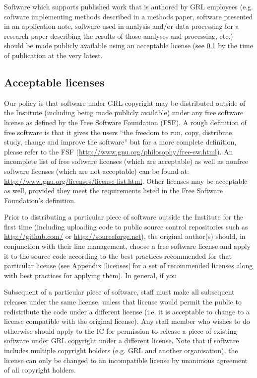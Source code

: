 \documentclass[10pt,a4paper]{article}
\begin{document}
\par Software which supports published work that is authored by GRL employees (e.g. 
software implementing methods described in a methods paper, software presented 
in an application note, software used in analysis and/or data processing for a 
research paper describing the results of those analyses and processing, etc.) should 
be made publicly available using an acceptable license (see \ref{policy.licenses} 
by the time of publication at the very latest. 




\subsection{Acceptable licenses}
\label{policy.licenses}
\par Our policy is that software under GRL copyright may be distributed outside of 
the Institute (including being made publicly available) under any free software 
license as defined by the Free Software Foundation (FSF). A rough definition of 
free software is that it gives the users 
``the freedom to run, copy, distribute, study, change and improve the software'' 
but for a more complete definition, please refer to the FSF 
(\url{http://www.gnu.org/philosophy/free-sw.html}). 
An incomplete list of free software licenses (which are acceptable) as well as 
nonfree software licenses (which are not acceptable) can be found at: 
\url{http://www.gnu.org/licenses/license-list.html}. Other licenses may be 
acceptable as well, provided they meet the requirements listed in the Free 
Software Foundation's definition. 

\par Prior to distributing a particular piece of software outside the Institute for the 
first time (including uploading code to public source control repositories such 
as \url{http://github.com/} or \url{http://sourceforge.net}), the original author(s) 
should, in conjunction with their line management, choose a free software 
license and apply it to the source code according to the best practices 
recommended for that particular license (see Appendix \ref{licenses} for a set 
of recommended licenses along with best practices for applying them). In 
general, if you 

\par Subsequent of a particular piece of software, staff must make all subsequent 
releases under the same license, unless that license would permit the public to 
redistribute the code under a different license (i.e. it is acceptable to change to a license 
compatible with the original license). Any staff member who wishes to do otherwise 
should apply to the IC for permission to release a piece of existing software under 
GRL copyright under a different license. Note that if software includes multiple 
copyright holders (e.g. GRL and another organisation), the license can only be changed 
to an incompatible license by unanimous agreement of all copyright holders. 
\end{document}
